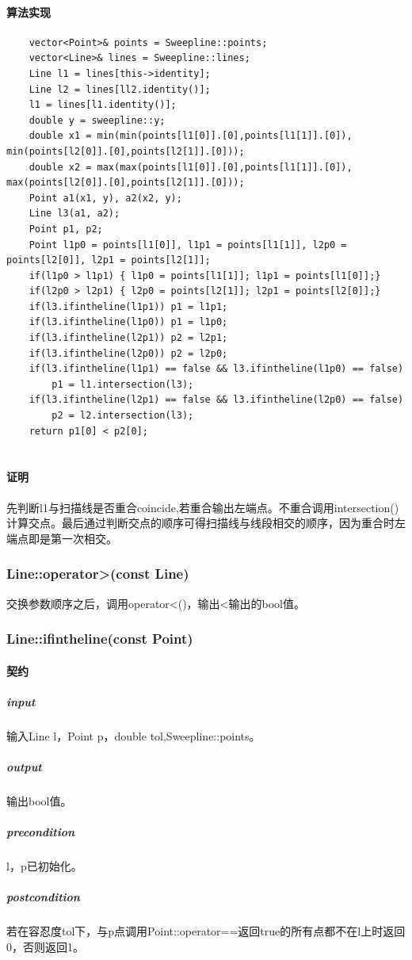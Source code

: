 \documentclass[a4paper]{book}
\numberwithin{equation}{chapter}
\theoremstyle{definition}
\begin{document}
\paragraph{算法实现}
\begin{lstlisting}
	vector<Point>& points = Sweepline::points;
	vector<Line>& lines = Sweepline::lines;
	Line l1 = lines[this->identity]; 
	Line l2 = lines[ll2.identity()];
	l1 = lines[l1.identity()];
	double y = sweepline::y;
	double x1 = min(min(points[l1[0]].[0],points[l1[1]].[0]), min(points[l2[0]].[0],points[l2[1]].[0]));
	double x2 = max(max(points[l1[0]].[0],points[l1[1]].[0]), max(points[l2[0]].[0],points[l2[1]].[0]));
	Point a1(x1, y), a2(x2, y);
	Line l3(a1, a2);
	Point p1, p2;
	Point l1p0 = points[l1[0]], l1p1 = points[l1[1]], l2p0 = points[l2[0]], l2p1 = points[l2[1]];
	if(l1p0 > l1p1) { l1p0 = points[l1[1]]; l1p1 = points[l1[0]];}
	if(l2p0 > l2p1) { l2p0 = points[l2[1]]; l2p1 = points[l2[0]];}
	if(l3.ifintheline(l1p1)) p1 = l1p1;
	if(l3.ifintheline(l1p0)) p1 = l1p0;
	if(l3.ifintheline(l2p1)) p2 = l2p1;
	if(l3.ifintheline(l2p0)) p2 = l2p0;
	if(l3.ifintheline(l1p1) == false && l3.ifintheline(l1p0) == false) 
		p1 = l1.intersection(l3);
	if(l3.ifintheline(l2p1) == false && l3.ifintheline(l2p0) == false) 
		p2 = l2.intersection(l3);
	return p1[0] < p2[0];
	
\end{lstlisting}
\paragraph{证明}
先判断l1与扫描线是否重合coincide,若重合输出左端点。不重合调用intersection()计算交点。最后通过判断交点的顺序可得扫描线与线段相交的顺序，因为重合时左端点即是第一次相交。

\subsubsection{Line::operator>(const Line)}
交换参数顺序之后，调用operator<()，输出<输出的bool值。

\subsubsection{Line::ifintheline(const Point)}
\paragraph{契约}
\subparagraph{input}
输入Line l，Point p，double tol,Sweepline::points。
\subparagraph{output}
输出bool值。
\subparagraph{precondition}
l，p已初始化。
\subparagraph{postcondition}
若在容忍度tol下，与p点调用Point::operator==返回true的所有点都不在l上时返回0，否则返回1。
\end{document}
